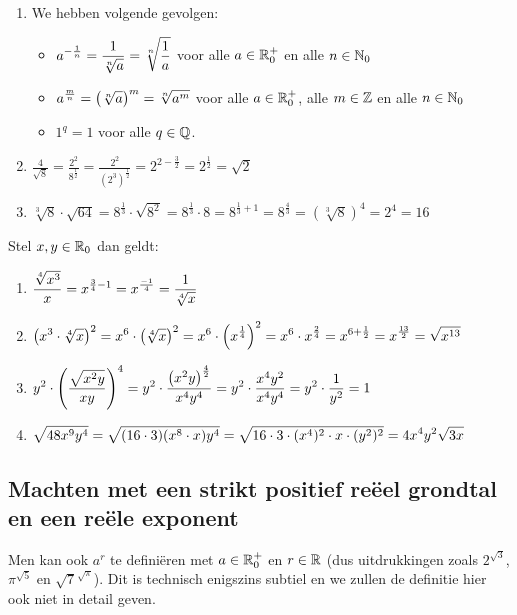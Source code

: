 \documentclass{ximera}
\begin{document}
\begin{example} \ 
	
	\begin{enumerate}
	\item  We hebben volgende gevolgen:
	\begin{itemize}
		\item $\displaystyle a^{-\frac{1}{n}}=\frac{1}{\sqrt[n]{a}}=\sqrt[n]{\frac{1}{a}}$ voor alle $a\in\mathbb{R}_0^+$ en alle $n\in\mathbb{N}_0$
		\item $\displaystyle a^{\frac{m}{n}}=\left(\sqrt[n]{a}\right)^m=\sqrt[n]{a^m}$ voor alle $a\in\mathbb{R}_0^+$, alle $m\in\mathbb{Z}$ en alle $n\in\mathbb{N}_0$
		\item $1^q=1$ voor alle $q\in\mathbb{Q}$.
	\end{itemize}

	\item $\frac{4}{\sqrt{8}}=\frac{2^{2}}{8^{\frac{1}{2}}}=\frac{2^{2}}{(2^{3})^{\frac{1}{2}}}=2^{2-\frac{3}{2}}=
	2^{\frac{1}{2}}=\sqrt{2}$
	\item
$\sqrt[3]{8} \cdot \sqrt{64}=8^{\frac{1}{3}}\cdot \sqrt{8^{2}}=8^{\frac{1}{3}}\cdot8=8^{\frac{1}{3}+1}=8^{\frac{4}{3}}=(\sqrt[3]{8})^4=2^4=16$
\end{enumerate}
	Stel $x,y \in \mathbb{R}_0$ dan geldt:
\begin{enumerate}[resume]
	\item
	$\displaystyle{\frac{\sqrt[4]{x^{3}}}{x}=x^{\frac{3}{4}-1}=x^{\frac{-1}{4}}=\frac{1}{\sqrt[4]{x}}}$
	\item
	$\displaystyle{\left(x^{3}\cdot \sqrt[4]{x}\right)^{2}=x^{6}\cdot \left(\sqrt[4]{x}\right)^{2}=x^{6}\cdot \left(x^{\frac{1}{4}}\right)^{2}=x^{6}\cdot x^{\frac{2}{4}}=
		x^{6+\frac{1}{2}}=x^{\frac{13}{2}}=\sqrt{x^{13}}}$
	\item
	$\displaystyle{y^{2} \cdot \left(\frac{\sqrt{x^{2}y}}{xy}\right)^{4}=y^{2} \cdot \frac{\left(x^{2}y\right)^{\frac{4}{2}}}{x^{4}y^{4}}=y^{2}\cdot \frac{x^{4}y^{2}}{x^{4}y^{4}}
		=y^{2} \cdot \frac{1}{y^{2}}=1}$
	\item
	$\displaystyle{\sqrt{48 x^{9}y^{4}}=\sqrt{(16 \cdot 3)(x^{8} \cdot
			x)y^{4}}=\sqrt{16 \cdot 3\cdot (x^{4})^{2}\cdot x\cdot
			(y^{2})^{2}}=4 x^{4}y^{2}\sqrt{3x}}$
	
\end{enumerate}
\end{example}
\subsection*{Machten met een strikt positief re\"eel grondtal en een re\"ele exponent}\label{machten-r}
Men kan ook $a^r$ te definiëren met $a\in\mathbb{R}_0^+$
en $r\in\mathbb{R}$ (dus uitdrukkingen zoals $2^{\sqrt{3}}$, $\pi^{\sqrt{5}}$ en $\sqrt{7}^{\sqrt{\pi}}$). Dit is technisch enigszins subtiel en we zullen de definitie hier
ook niet in detail geven. 
\end{document}
